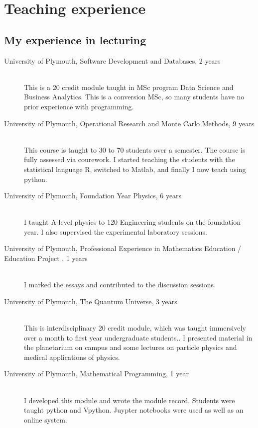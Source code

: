 \documentclass[12pt]{article}
\begin{document}
\FloatBarrier

%
\section{Teaching experience}

\subsection{My experience in lecturing}


\begin{description}

 \item[University of Plymouth, 
Software Development and Databases,
2 years]\hfill \\ This is a 20 credit module taught in
MSc program Data Science and Business Analytics. This is a conversion
MSc, so many students have no prior experience with programming.

  \item[University of Plymouth, Operational Research and Monte Carlo Methods,
9 years] \hfill \\
This course is taught to  30 to 70 students over a semester. The course is fully
assessed via courework. I started teaching the students with the statistical language R, switched 
to Matlab, and finally I now teach using python.

  \item[University of Plymouth, Foundation Year Physics,
6 years] \hfill \\
I taught A-level physics to 120 Engineering students
on the foundation year. I also supervised the experimental 
laboratory sessions.

\item[University of Plymouth, Professional Experience in Mathematics
  Education / Education Project ,
1 years] \hfill \\
I marked the essays and contributed to the discussion sessions.

  \item[University of Plymouth, The Quantum Universe,
3 years] \hfill \\
This is interdisciplinary 20 credit module, which was taught
immersively over a month to first year undergraduate students.. 
I presented material in the planetarium on campus and some lectures on
particle physics and medical applications of physics.

  \item[University of Plymouth, Mathematical Programming,
1 year] \hfill \\
I developed this module and wrote the module record. Students
were taught python and Vpython. Juypter notebooks were used as well
as an online system.


\end{description}
\end{document}
